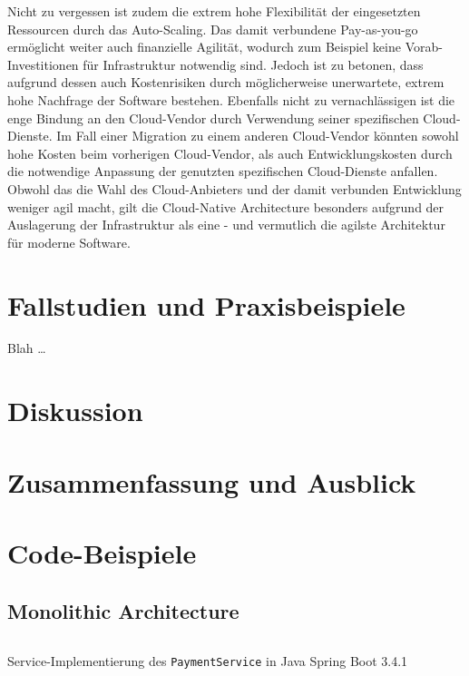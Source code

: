 \documentclass[acmtog]{acmart}
\begin{document}
Nicht zu vergessen ist zudem die extrem hohe Flexibilität der eingesetzten Ressourcen durch das Auto-Scaling.
Das damit verbundene Pay-as-you-go ermöglicht weiter auch finanzielle Agilität, wodurch zum Beispiel keine Vorab-Investitionen für Infrastruktur notwendig sind.
Jedoch ist zu betonen, dass aufgrund dessen auch Kostenrisiken durch möglicherweise unerwartete, extrem hohe Nachfrage der Software bestehen.
Ebenfalls nicht zu vernachlässigen ist die enge Bindung an den Cloud-Vendor durch Verwendung seiner spezifischen Cloud-Dienste.
Im Fall einer Migration zu einem anderen Cloud-Vendor könnten sowohl hohe Kosten beim vorherigen Cloud-Vendor, als auch Entwicklungskosten durch die notwendige
Anpassung der genutzten spezifischen Cloud-Dienste anfallen.
Obwohl das die Wahl des Cloud-Anbieters und der damit verbunden Entwicklung weniger agil macht, gilt die Cloud-Native Architecture besonders aufgrund der Auslagerung
der Infrastruktur als eine - und vermutlich die agilste Architektur für moderne Software.

\section{Fallstudien und Praxisbeispiele}
Blah \ldots

\section{Diskussion}

\section{Zusammenfassung und Ausblick}









\appendix

\section{Code-Beispiele}

\subsection{Monolithic Architecture}
\label{app:code:monolithic:paymentservice}
\begin{listing}[H]
  \tiny
  \inputminted[linenos=true]{java}{code/monolithic/PaymentService.java}
  \caption{Service-Implementierung des \texttt{PaymentService} in Java Spring Boot 3.4.1}
\end{listing}
\end{document}
